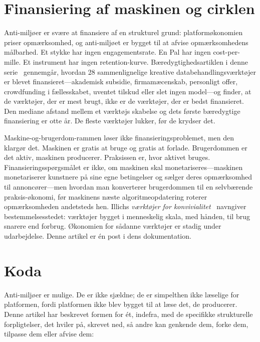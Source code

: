 \documentclass[10pt,letterpaper,twocolumn]{article}
\begin{document}
\section{Finansiering af maskinen og cirklen}

Anti-miljøer er svære at finansiere af en strukturel grund: platformøkonomien priser opmærksomhed, og anti-miljøet er bygget til at afvise opmærksomhedens målbarhed. Et stykke har ingen engagementsrate. En Pal har ingen cost-per-mille. Et instrument har ingen retention-kurve. Bæredygtighedsartiklen i denne serie~\citep{scudder2026sustainability} gennemgår, hvordan 28 sammenlignelige kreative databehandlingsværktøjer er blevet finansieret---akademisk subsidie, firmamæcenskab, personligt offer, crowdfunding i fællesskabet, uventet tilskud eller slet ingen model---og finder, at de værktøjer, der er mest brugt, ikke er de værktøjer, der er bedst finansieret. Den mediane afstand mellem et værktøjs skabelse og dets første bæredygtige finansiering er otte år. De fleste værktøjer lukker, før de krydser det.

Maskine-og-brugerdom-rammen løser ikke finansieringsproblemet, men den klargør det. Maskinen er gratis at bruge og gratis at forlade. Brugerdommen er det aktiv, maskinen producerer. Praksissen er, hvor aktivet bruges. Finansieringsspørgsmålet er ikke, om maskinen skal monetariseres---maskinen monetariserer kunstnere på sine egne betingelser og sælger deres opmærksomhed til annoncører---men hvordan man konverterer brugerdommen til en selvbærende praksis-økonomi, før maskinens næste algoritmeopdatering roterer opmærksomheden andetsteds hen. Illichs \emph{værktøjer for konvivialitet}~\citep{illich1973tools} navngiver bestemmelsesstedet: værktøjer bygget i menneskelig skala, med hånden, til brug snarere end forbrug. Økonomien for sådanne værktøjer er stadig under udarbejdelse. Denne artikel er én post i dens dokumentation.

\section{Koda}

Anti-miljøer er mulige. De er ikke sjældne; de er simpelthen ikke læselige for platformen, fordi platformen ikke blev bygget til at læse det, de producerer. Denne artikel har beskrevet formen for ét, indefra, med de specifikke strukturelle forpligtelser, det hviler på, skrevet ned, så andre kan genkende dem, forke dem, tilpasse dem eller afvise dem:
\end{document}
